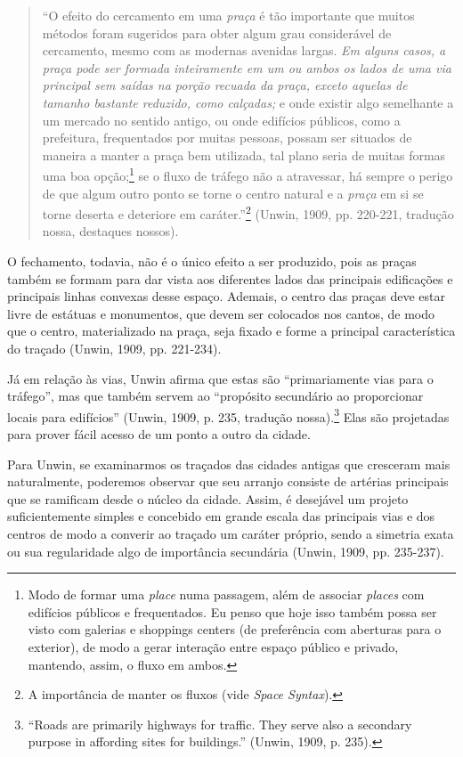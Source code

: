 \documentclass[12pt, a4paper]{book} %
\begin{document}
        \begin{quotation}
            ``O efeito do cercamento em uma \textit{praça} é tão importante que muitos métodos foram sugeridos para obter algum grau considerável de cercamento, mesmo com as modernas avenidas largas. \textit{Em alguns casos, a praça pode ser formada inteiramente em um ou ambos os lados de uma via principal sem saídas na porção recuada da praça, exceto aquelas de tamanho bastante reduzido, como calçadas;} e onde existir algo semelhante a um mercado no sentido antigo, ou onde edifícios públicos, como a prefeitura, frequentados por muitas pessoas, possam ser situados de maneira a manter a praça bem utilizada, tal plano seria de muitas formas uma boa opção;\footnote[67]{Modo de formar uma \textit{place} numa passagem, além de associar \textit{places} com edifícios públicos e frequentados.
            Eu penso que hoje isso também possa ser visto com galerias e shoppings centers (de preferência com aberturas para o exterior), de modo a gerar interação entre espaço público e privado, mantendo, assim, o fluxo em ambos.} se o fluxo de tráfego não a atravessar, há sempre o perigo de que algum outro ponto se torne o centro natural e a \textit{praça} em si se torne deserta e deteriore em caráter.''\footnote[68]{A importância de manter os fluxos (vide \textit{Space Syntax}).} (Unwin, 1909, pp. 220-221, tradução nossa, destaques nossos).
        \end{quotation}

        O fechamento, todavia, não é o único efeito a ser produzido, pois as praças também se formam para dar vista aos diferentes lados das principais edificações e principais linhas convexas desse espaço. Ademais, o centro das praças deve estar livre de estátuas e monumentos, que devem ser colocados nos cantos, de modo que o centro, materializado na praça, seja fixado e forme a principal característica do traçado (Unwin, 1909, pp. 221-234).

        Já em relação às vias, Unwin afirma que estas são ``primariamente vias para o tráfego'', mas que também servem ao ``propósito secundário ao proporcionar locais para edifícios'' (Unwin, 1909, p. 235, tradução nossa).\footnote[71]{``Roads are primarily highways for traffic. They serve also a secondary purpose in affording sites for buildings.'' (Unwin, 1909, p. 235).} Elas são projetadas para prover fácil acesso de um ponto a outro da cidade.

        Para Unwin, se examinarmos os traçados das cidades antigas que cresceram mais naturalmente, poderemos observar que seu arranjo consiste de artérias principais que se ramificam desde o núcleo da cidade. Assim, é desejável um projeto suficientemente simples e concebido em grande escala das principais vias e dos centros de modo a converir ao traçado um caráter próprio, sendo a simetria exata ou sua regularidade algo de importância secundária (Unwin, 1909, pp. 235-237).
\end{document}

